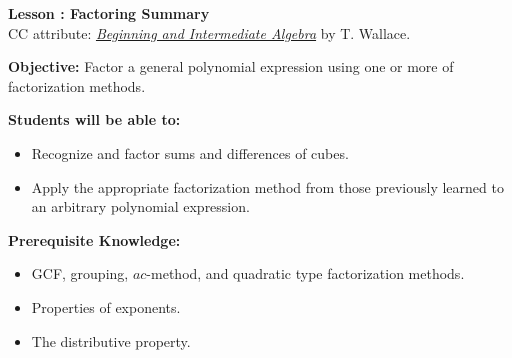 \documentclass[12pt]{article}
\theoremstyle{definition}
\begin{document}
{\bf \large Lesson : Factoring Summary}
\\ CC attribute: \href{http://www.wallace.ccfaculty.org/book/book.html}{\it{Beginning and Intermediate Algebra}} by T. Wallace. 
\hfill \doclicenseImage[imagewidth=5em]\\
\par
{\bf Objective:} Factor a general polynomial expression using one or more of factorization methods.\\
\par
{\bf Students will be able to:}
\begin{itemize}
	\item Recognize and factor sums and differences of cubes.
	\item Apply the appropriate factorization method from those previously learned to an arbitrary polynomial expression.
\end{itemize}
{\bf Prerequisite Knowledge:}
\begin{itemize}
	\item GCF, grouping, $ac$-method, and quadratic type factorization methods.
	\item Properties of exponents.
	\item The distributive property.
\end{itemize}
\hrulefill
\end{document}
